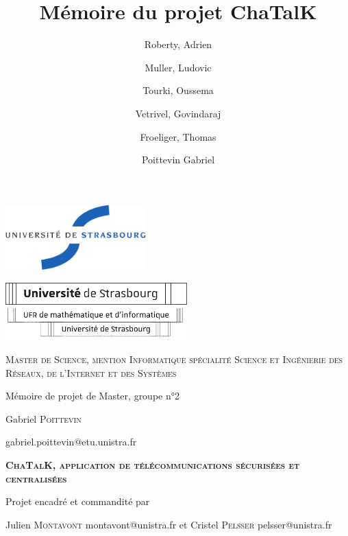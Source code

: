 \documentclass{memoire}
\title{Mémoire du projet ChaTalK}
\author{
  Roberty, Adrien \and
  Muller, Ludovic \and
  Tourki, Oussema \and
  Vetrivel, Govindaraj \and
  Froeliger, Thomas \and
  Poittevin Gabriel
}
\begin{document}

\thispagestyle{empty}

\begin{center}
  \includegraphics[height=2.5cm]{logos/logo-uds-couleur.pdf}
  \vfill

  \includegraphics[width=7.0cm]{logos/logo-uds.pdf}\\

  \includegraphics[width=7.0cm]{logos/logo-ufr.pdf}
  \vfill
  \vfill

  {
  \large
  \textsc {
    Master de Science, mention Informatique
    spécialité Science et Ingénierie des Réseaux, de l'Internet
    et des Systèmes
  }
  }

  \bigskip

  {\large Mémoire de projet de Master, groupe n°2}

  \medskip

  {\large Gabriel \textsc {Poittevin}}

  {\small gabriel.poittevin@etu.unistra.fr}

  \vfill

  {
  \begin{spacing}{1.4}
  \huge
  \textsc {
  \textbf {
      ChaTalK, application de télécommunications sécurisées et centralisées
  }
  }
  \end{spacing}
  }

  \vfill

  {\large Projet encadré et commandité par}

  \medskip

  {\large Julien \textsc {Montavont}}
  {\small montavont@unistra.fr}
  et
  {\large Cristel \textsc {Pelsser}}
  {\small pelsser@unistra.fr}


\end{center}
\end{document}
